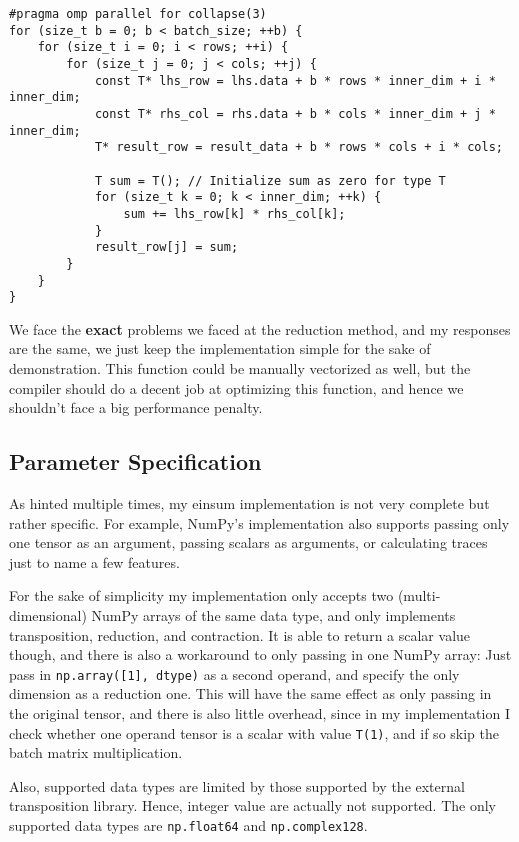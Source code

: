\documentclass[sigconf]{acmart}
\begin{document}
\begin{verbatim}
#pragma omp parallel for collapse(3)
for (size_t b = 0; b < batch_size; ++b) {
    for (size_t i = 0; i < rows; ++i) {
        for (size_t j = 0; j < cols; ++j) {
            const T* lhs_row = lhs.data + b * rows * inner_dim + i * inner_dim;
            const T* rhs_col = rhs.data + b * cols * inner_dim + j * inner_dim;
            T* result_row = result_data + b * rows * cols + i * cols;

            T sum = T(); // Initialize sum as zero for type T
            for (size_t k = 0; k < inner_dim; ++k) {
                sum += lhs_row[k] * rhs_col[k];
            }
            result_row[j] = sum;
        }
    }
}
\end{verbatim}

We face the \textbf{exact} problems we faced at the reduction method, and my responses are the same, we just keep the implementation simple for the sake of demonstration. This function could be manually vectorized as well, but the compiler should do a decent job at optimizing this function, and hence we shouldn't face a big performance penalty.

\subsection{Parameter Specification}
As hinted multiple times, my einsum implementation is not very complete but rather specific. For example, NumPy's implementation also supports passing only one tensor as an argument, passing scalars as arguments, or calculating traces just to name a few features.

For the sake of simplicity my implementation only accepts two (multi-dimensional) NumPy arrays of the same data type, and only implements transposition, reduction, and contraction. It is able to return a scalar value though, and there is also a workaround to only passing in one NumPy array: Just pass in \texttt{np.array([1], dtype)} as a second operand, and specify the only dimension as a reduction one. This will have the same effect as only passing in the original tensor, and there is also little overhead, since in my implementation I check whether one operand tensor is a scalar with value \texttt{T(1)}, and if so skip the batch matrix multiplication.

Also, supported data types are limited by those supported by the external transposition library. Hence, integer value are actually not supported. The only supported data types are \texttt{np.float64} and \texttt{np.complex128}.
\end{document}
